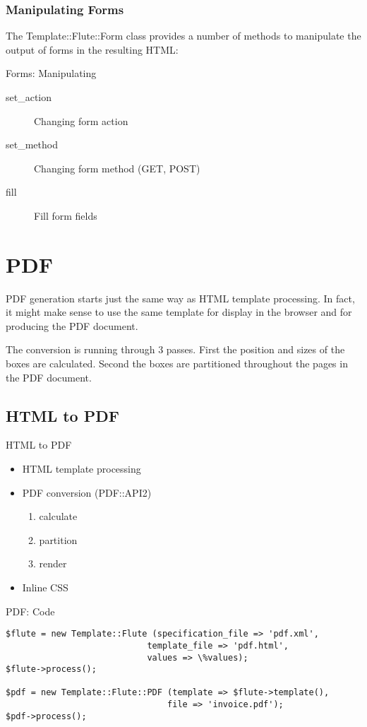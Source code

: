 \subsubsection{Manipulating Forms}
The Template::Flute::Form class provides a number of methods
to manipulate the output of forms in the resulting HTML:

\begin{frame}{Forms: Manipulating}
  \begin{description}
  \item[set\_action] Changing form action
  \item[set\_method] Changing form method (GET, POST)
  \item[fill] Fill form fields
  \end{description}
\end{frame}

\section{PDF}
PDF generation starts just the same way as HTML template
processing. In fact, it might make sense to use the same template
for display in the browser and for producing the PDF document.

The conversion is running through 3 passes. First the position
and sizes of the boxes are calculated. Second the boxes are
partitioned throughout the pages in the PDF document.

\subsection{HTML to PDF}
\begin{frame}{HTML to PDF}
  \begin{itemize}
  \item HTML template processing
  \item PDF conversion (PDF::API2)
    \begin{enumerate}
    \item calculate
    \item partition
    \item render
    \end{enumerate}
  \item Inline CSS 
  \end{itemize}
\end{frame}

\begin{frame}[fragile]{PDF: Code}
\begin{lstlisting}
$flute = new Template::Flute (specification_file => 'pdf.xml',
                            template_file => 'pdf.html',
                            values => \%values);
$flute->process();

$pdf = new Template::Flute::PDF (template => $flute->template(),
                                file => 'invoice.pdf');
$pdf->process();
\end{lstlisting}
\end{frame}

